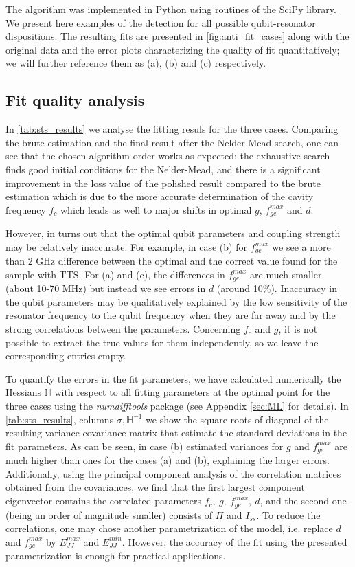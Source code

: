 \documentclass[%
 aip,
 draft,
 amsmath,amssymb,
 reprint,%
]{revtex4-1}
\begin{document}
The algorithm was implemented in Python using  routines of the SciPy\cite{scipy} library. We present here examples of the detection for all possible qubit-resonator dispositions.  The resulting fits are presented in \autoref{fig:anti_fit_cases} along with the original data and the error plots characterizing the quality of fit quantitatively; we will further reference them as (a), (b) and (c) respectively.

\subsection{Fit quality analysis} 

In \autoref{tab:sts_results} we analyse the fitting resuls for the three cases. Comparing the brute estimation and the final result after the Nelder-Mead search, one can see that the chosen algorithm order works as expected: the exhaustive search finds good initial conditions for the Nelder-Mead, and there is a significant improvement in the loss value of the polished result compared to the brute estimation which is due to the more accurate determination of the cavity frequency $f_c$ which leads as well to major shifts in optimal $g$, $f_{ge}^{max}$ and $d$.

However, in turns out that the optimal qubit parameters and coupling strength may be relatively inaccurate. For example, in case (b) for $f_{ge}^{max}$ we see a more than 2 GHz difference between the optimal and the correct value found for the sample with TTS. For (a) and (c), the differences in $f_{ge}^{max}$ are much smaller (about 10-70 MHz) but instead we see errors in $d$ (around 10\%). Inaccuracy in the qubit parameters may be qualitatively explained by the low sensitivity of the resonator frequency to the qubit frequency when they are far away and by the strong correlations between the parameters. Concerning $f_c$ and $g$, it is not possible to extract the true values for them independently, so we leave the corresponding entries empty.

To quantify the errors in the fit parameters, we have calculated numerically the Hessians $\mathbb{H}$ with respect to all fitting parameters at the optimal point for the three cases using the \textit{numdifftools}\cite{numdifftools} package (see Appendix \ref{sec:ML} for details). In \autoref{tab:sts_results}, columns $\sigma, \mathbb{H}^{-1}$ we show the square roots of diagonal of the resulting variance-covariance matrix that estimate the standard deviations in the fit parameters. As can be seen, in case (b) estimated variances for $g$ and $f_{ge}^{max}$ are much higher than ones for the cases (a) and (b), explaining the larger errors. Additionally, using the principal component analysis of the correlation matrices obtained from the covariances, we find that the first largest component eigenvector contains the correlated parameters $f_c,\ g,\ f_{ge}^{max},\ d$, and the second one (being an order of magnitude smaller) consists of $\Pi$ and $I_{ss}$. To reduce the correlations, one may chose another parametrization of the model, i.e. replace $d$ and $f_{ge}^{max}$ by $ E_{JJ}^{max} $ and $ E_{JJ}^{min} $. However, the accuracy of the fit using the presented parametrization is enough for practical applications.
\end{document}
